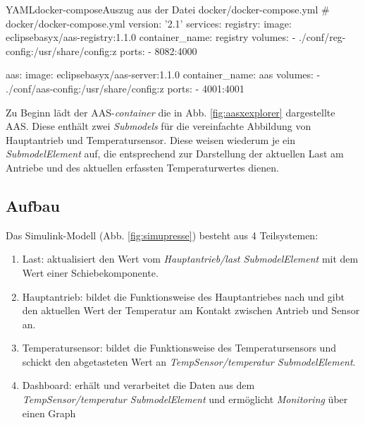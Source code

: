 
\begin{codeblock}{YAML}{docker-compose}{Auszug aus der Datei docker/docker-compose.yml}
    # docker/docker-compose.yml
    version: '2.1'
    services:
    registry:
        image: eclipsebasyx/aas-registry:1.1.0
        container_name: registry
        volumes:
            - ./conf/reg-config:/usr/share/config:z
        ports:
            - 8082:4000

    aas:
        image: eclipsebasyx/aas-server:1.1.0
        container_name: aas
        volumes:
            - ./conf/aas-config:/usr/share/config:z
        ports:
            - 4001:4001
\end{codeblock}

Zu Beginn lädt der AAS-\textit{container} die in Abb. \ref{fig:aasxexplorer} dargestellte AAS. Diese enthält zwei \textit{Submodels} für die vereinfachte Abbildung von Hauptantrieb und Temperatursensor. Diese weisen wiederum je ein \textit{SubmodelElement} auf, die entsprechend zur Darstellung der aktuellen Last am Antriebe und des aktuellen erfassten Temperaturwertes dienen.  




\subsection{Aufbau}

Das Simulink-Modell (Abb. \ref{fig:simupresse}) besteht aus 4 Teilsystemen:
\begin{enumerate}
    \item Last: aktualisiert den Wert vom \textit{Hauptantrieb/last SubmodelElement} mit dem Wert einer Schiebekomponente.
    \item Hauptantrieb: bildet die Funktionsweise des Hauptantriebes nach und gibt den aktuellen Wert der Temperatur am Kontakt zwischen Antrieb und Sensor an.
    \item Temperatursensor: bildet die Funktionsweise des Temperatursensors und schickt den abgetasteten Wert an  \textit{TempSensor/temperatur SubmodelElement}.
    \item Dashboard: erhält und verarbeitet die Daten aus dem  \textit{TempSensor/temperatur SubmodelElement} und ermöglicht \textit{Monitoring} über einen Graph
\end{enumerate}  


